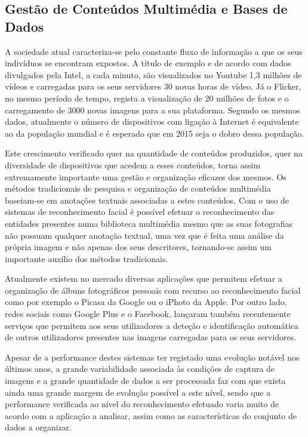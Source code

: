 \subsection{Gestão de Conteúdos Multimédia e Bases de Dados} \label{GestaoMultimedia}
A sociedade atual caracteriza-se pelo constante fluxo de informação a que os seus indivíduos se encontram expostos. A título de exemplo e de acordo com dados divulgados pela Intel\cite{IntelCorporation}, a cada minuto, são visualizados no Youtube 1,3 milhões de vídeos e carregadas para os seus servidores 30 novas horas de vídeo. Já o Flicker, no mesmo período de tempo, regista a visualização de 20 milhões de fotos e o carregamento de 3000 novas imagens para a sua plataforma. Segundo os mesmos dados, atualmente o número de dispositivos com ligação à Internet é equivalente ao da população mundial e é esperado que em 2015 seja o dobro dessa população.

Este crescimento verificado quer na quantidade de conteúdos produzidos, quer na diversidade de dispositivos que acedem a esses conteúdos, torna assim extremamente importante uma gestão e organização eficazes dos mesmos. Os métodos tradicionais de pesquisa e organização de conteúdos multimédia baseiam-se em anotações textuais associadas a estes conteúdos. Com o uso de sistemas de reconhecimento facial é possível efetuar o reconhecimento das entidades presentes numa biblioteca multimédia mesmo que as suas fotografias não possuam qualquer anotação textual, uma vez que é feita uma análise da própria imagem e não apenas dos seus descritores, tornando-se assim um importante auxílio dos métodos tradicionais.

Atualmente existem no mercado diversas aplicações que permitem efetuar a organização de álbuns fotográficos  pessoais com recurso ao reconhecimento facial como por exemplo o Picasa da Google ou o iPhoto da Apple. Por outro lado, redes sociais como Google Plus e o Facebook, lançaram também recentemente serviços que permitem aos seus utilizadores a deteção e identificação automática de outros utilizadores presentes nas imagens carregadas para os seus servidores.

Apesar de a performance destes sistemas ter registado uma evolução notável nos últimos anos, a grande variabilidade associada às condições de captura de imagens e a grande quantidade de dados a ser processada faz com que exista ainda uma grande margem de evolução possível a este nível, sendo que a performance verificada ao nível do reconhecimento efetuado varia muito de acordo com a aplicação a analisar, assim como as características do conjunto de dados a organizar.

